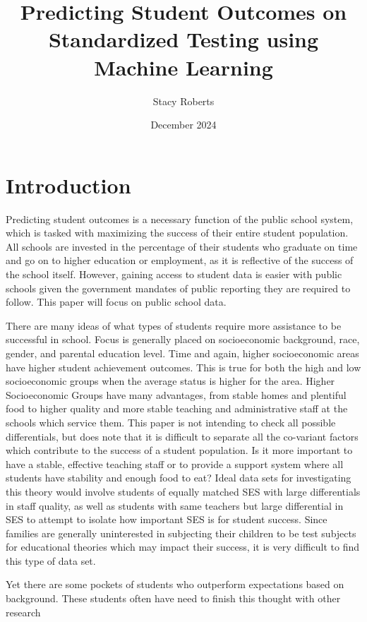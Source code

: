 \documentclass[doc]{apa6} %
\date{December 2024}
\title{Predicting Student Outcomes on Standardized Testing using Machine Learning}
\author{Stacy Roberts}
\affiliation{The University of Texas at Austin}
\begin{document}
\maketitle

\section{Introduction}

Predicting student outcomes is a necessary function of the public school system, which is tasked with maximizing the success of their entire student population. All schools are invested in the percentage of their students who graduate on time and go on to higher education or employment, as it is reflective of the success of the school itself. However, gaining access to student data is easier with public schools given the government mandates of public reporting they are required to follow. \cite{ecsa} This paper will focus on public school data.

There are many ideas of what types of students require more assistance to be successful in school. Focus is generally placed on socioeconomic background, race, gender, and parental education level. \cite{Bradley2022SESgap}  Time and again, higher socioeconomic areas have higher student achievement outcomes. This is true for both the high and low socioeconomic groups when the average status is higher for the area.  Higher Socioeconomic Groups have many advantages, from stable homes and plentiful food to higher quality and more stable teaching and administrative staff at the schools which service them. \cite{HSEffectsLongTerm} This paper is not intending to check all possible differentials, but does note that it is difficult to separate all the co-variant factors which contribute to the success of a student population. Is it more important to have a stable, effective teaching staff or to provide a support system where all students have stability and enough food to eat? Ideal data sets for investigating this theory would involve students of equally matched SES with large differentials in staff quality, as well as students with same teachers but large differential in SES to attempt to isolate how important SES is for student success. Since families are generally uninterested in subjecting their children to be test subjects for educational theories which may impact their success, it is very difficult to find this type of data set.

Yet there are some pockets of students who outperform expectations based on background. \cite{YanGaiLowSEG} These students often have need to finish this thought with other research
\end{document}

